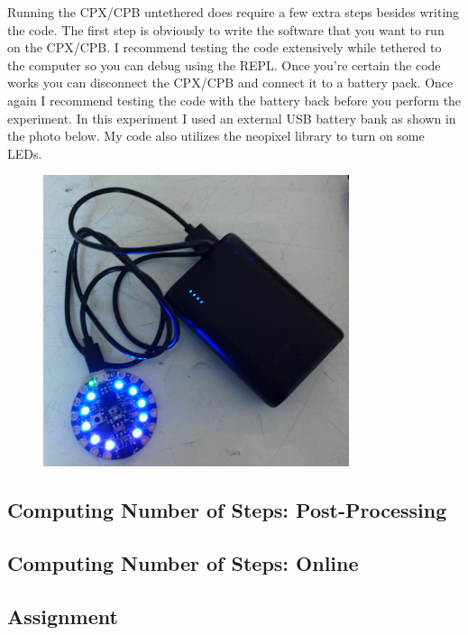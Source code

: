 Running the CPX/CPB untethered does require a few extra steps besides
writing the code. The first step is obviously to write the software
that you want to run on the CPX/CPB. I recommend testing the code
extensively while tethered to the computer so you can debug using the
REPL. Once you're certain the code works you can disconnect the
CPX/CPB and connect it to a battery pack. Once again I recommend
testing the code with the battery back before you perform the
experiment. In this experiment I used an external USB battery bank as
shown in the photo below. My code also utilizes the neopixel library
to turn on some LEDs. 
\begin{figure}[H]
  \begin{center}
    \includegraphics[width=0.8\textwidth]{Figures/External_Battery_Pack.jpg}
  \end{center}
\end{figure}

\subsection{Computing Number of Steps: Post-Processing}

\subsection{Computing Number of Steps: Online}

\subsection{Assignment}

